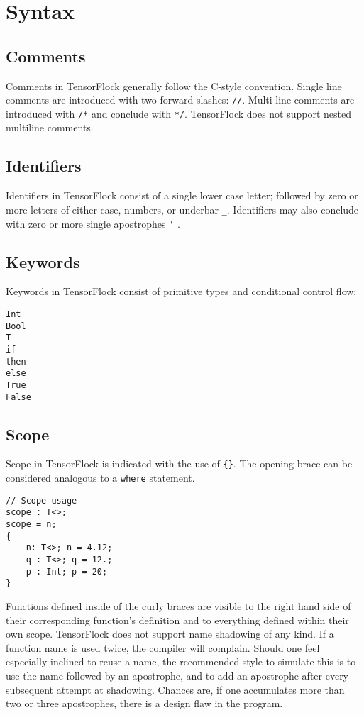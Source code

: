 \section{Syntax}%
\label{sec:syntax}
\subsection{Comments}
Comments in TensorFlock generally follow the C-style convention. Single line
comments are introduced with two forward slashes: \lstinline|//|. Multi-line
comments are introduced with \lstinline|/*| and conclude with \lstinline|*/|.
TensorFlock does not support nested multiline comments.
\subsection{Identifiers}
Identifiers in TensorFlock consist of a single lower case letter; followed by zero 
or more letters of either case, numbers, or underbar \lstinline|_|.
Identifiers may also conclude with zero or more single apostrophes \lstinline|'| .
\subsection{Keywords}
Keywords in TensorFlock consist of primitive types and conditional control flow:
\begin{lstlisting}
Int
Bool
T
if
then
else
True
False
\end{lstlisting}
\subsection{Scope}
Scope in TensorFlock is indicated with the use of \lstinline|{}|. The opening brace can be considered analogous to a \lstinline|where| statement.
\begin{lstlisting}
// Scope usage
scope : T<>;
scope = n; 
{ 
    n: T<>; n = 4.12;
    q : T<>; q = 12.; 
    p : Int; p = 20;
}
\end{lstlisting}
Functions defined inside of the curly braces are visible to the right hand
side of their corresponding function's definition and to everything defined
within their own scope. TensorFlock does not support name shadowing of any
kind. If a function name is used twice, the compiler will complain. Should one
feel especially inclined to reuse a name, the recommended style to simulate
this is to use the name followed by an apostrophe, and to add an apostrophe
after every subsequent attempt at shadowing. Chances are, if one accumulates
more than two or three apostrophes, there is a design flaw in the program.

